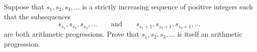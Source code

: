 Suppose that $s_1, s_2, s_3, \ldots$ is a strictly increasing sequence of positive integers such that the subsequences
\[
s_{s_1}, s_{s_2}, s_{s_3}, \ldots \qquad \text{and} \qquad s_{s_1+1}, s_{s_2+1}, s_{s_3+1}, \ldots
\]
are both arithmetic progressions. Prove that $s_1, s_2, s_3, \ldots$ is itself an arithmetic progression.
